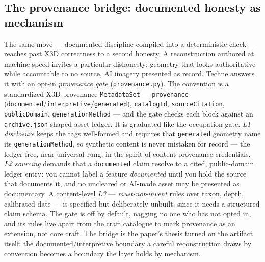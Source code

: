 \documentclass[sigconf,nonacm,screen,anonymous]{acmart}
\begin{document}
\subsection{The provenance bridge: documented honesty as mechanism}
The same move --- documented discipline compiled into a deterministic check --- reaches past X3D correctness to a second honesty. A reconstruction authored at machine speed invites a particular dishonesty: geometry that looks authoritative while accountable to no source, AI imagery presented as record. Technē answers it with an opt-in \emph{provenance gate} (\texttt{provenance.py}). The convention is a standardized X3D provenance \texttt{MetadataSet} --- \texttt{provenance} (\texttt{documented}/\texttt{interpretive}/\texttt{generated}), \texttt{catalogId}, \texttt{sourceCitation}, \texttt{publicDomain}, \texttt{generationMethod} --- and the gate checks each block against an \texttt{archive.json}-shaped asset ledger. It is graduated like the occupation gate. \emph{L1 disclosure} keeps the tags well-formed and requires that \texttt{generated} geometry name its \texttt{generationMethod}, so synthetic content is never mistaken for record --- the ledger-free, near-universal rung, in the spirit of content-provenance credentials. \emph{L2 sourcing} demands that a \texttt{documented} claim resolve to a cited, public-domain ledger entry: you cannot label a feature \emph{documented} until you hold the source that documents it, and no uncleared or AI-made asset may be presented as documentary. A content-level \emph{L3} --- \emph{must-not-invent} rules over taxon, depth, calibrated date --- is specified but deliberately unbuilt, since it needs a structured claim schema. The gate is off by default, nagging no one who has not opted in, and its rules live apart from the craft catalogue to mark provenance as an extension, not core craft. The bridge is the paper's thesis turned on the artifact itself: the documented/interpretive boundary a careful reconstruction draws by convention becomes a boundary the layer holds by mechanism.
\end{document}
